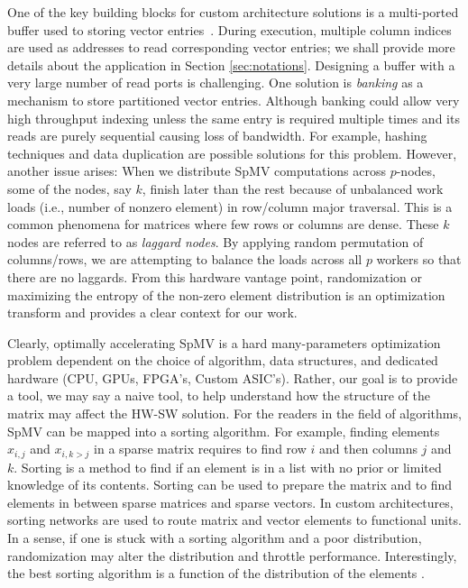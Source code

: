 \documentclass[manuscript,screen]{acmart}
\begin{document}
One of the key building blocks for custom architecture solutions is a
multi-ported buffer used to storing vector
entries~\cite{fowers2014high}.  During execution, multiple column
indices are used as addresses to read corresponding vector entries; we
shall provide more details about the application in Section
\ref{sec:notations}.  Designing a buffer with a very large number of
read ports is challenging.  One solution is {\em banking} as a
mechanism to store partitioned vector entries.  Although banking could
allow very high throughput indexing unless the same entry is required
multiple times and its reads are purely sequential causing loss of
bandwidth.  For example, hashing techniques and data duplication are
possible solutions for this problem. However, another issue arises:
When we distribute SpMV computations across $p$-nodes, some of the
nodes, say $k$, finish later than the rest because of unbalanced work
loads (i.e., number of nonzero element) in row/column major
traversal. This is a common phenomena for matrices where few rows or
columns are dense. These $k$ nodes are referred to as {\em laggard
  nodes}.  By applying random permutation of columns/rows, we are
attempting to balance the loads across all $p$ workers so that there
are no laggards. From this hardware vantage point, randomization or
maximizing the entropy of the non-zero element distribution is an
optimization transform and provides a clear context for our work.

Clearly, optimally accelerating SpMV is a hard many-parameters
optimization problem dependent on the choice of algorithm, data
structures, and dedicated hardware (CPU, GPUs, FPGA's, Custom ASIC's).
Rather, our goal is to provide a tool, we may say a naive tool, to
help understand how the structure of the matrix may affect the HW-SW
solution.  For the readers in the field of algorithms, SpMV can be
mapped into a sorting algorithm. For example, finding elements
$x_{i,j}$ and $x_{i,k>j}$ in a sparse matrix requires to find row $i$
and then columns $j$ and $k$.  Sorting is a method to find if an
element is in a list with no prior or limited knowledge of its
contents.  Sorting can be used to prepare the matrix and to find
elements in between sparse matrices and sparse vectors. In custom
architectures, sorting networks are used to route matrix and vector
elements to functional units. In a sense, if one is stuck with a
sorting algorithm and a poor distribution, randomization may alter the
distribution and throttle performance. Interestingly, the best sorting
algorithm is a function of the distribution of the elements
\cite{LiGP2004,HuangGl2009}.
\end{document}
